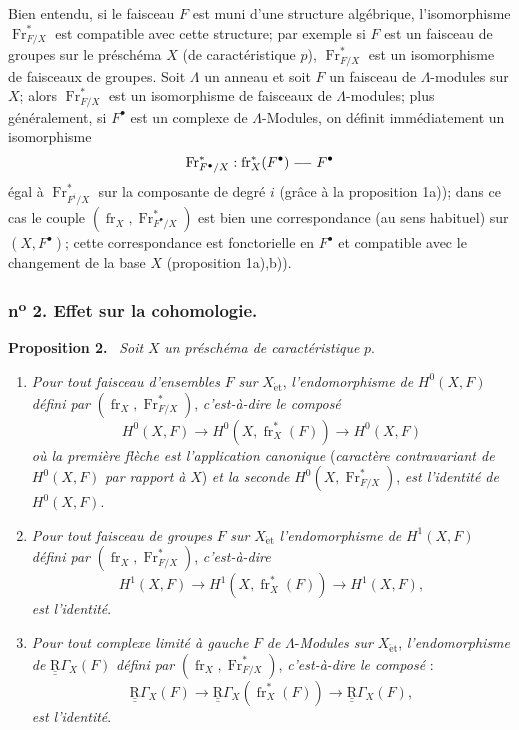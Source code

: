 \documentclass[11pt]{article}
\newenvironment{statement}[1]{\par\medskip\noindent\textbf{#1.}\ }{\par\medskip}
\providecommand{\et}{\mathrm{\acute{e}t}}
\providecommand{\fr}{\operatorname{fr}}
\providecommand{\Fr}{\operatorname{Fr}}
\providecommand{\Fr}{\operatorname{Fr}}
\providecommand{\fr}{\operatorname{fr}}
\providecommand{\et}{\acute{e}t}
\begin{document}
Bien entendu, si le faisceau $F$ est muni d'une structure algébrique, l'isomorphisme $\Fr^*_{F/X}$ est compatible avec cette structure; par exemple si $F$ est un faisceau de groupes sur le préschéma $X$ (de caractéristique $p$), $\Fr^*_{F/X}$ est un isomorphisme de faisceaux de groupes. Soit $\Lambda$ un anneau et soit $F$ un faisceau de $\Lambda$-modules sur $X$; alors $\operatorname{Fr}^*_{F/X}$ est un isomorphisme de faisceaux de $\Lambda$-modules; plus généralement, si $F^\bullet$ est un complexe de $\Lambda$-Modules, on définit immédiatement un isomorphisme
\[
\Fr^*_{F^\bullet/X}:\fr_X^*(F^\bullet)\relbar\joinrel\relbar F^\bullet
\]
égal à $\Fr^*_{F^i/X}$ sur la composante de degré $i$ (grâce à la proposition 1a)); dans ce cas le couple $(\fr_X,\Fr^*_{F^\bullet/X})$ est bien une correspondance (au sens habituel) sur $(X,F^\bullet)$; cette correspondance est fonctorielle en $F^\bullet$ et compatible avec le changement de la base $X$ (proposition 1a),b)).

\subsubsection*{n\textsuperscript{o} 2. Effet sur la cohomologie.}

\begin{statement}{Proposition 2}
\emph{Soit} $X$ \emph{un préschéma de caractéristique} $p$.
\begin{enumerate}[label=\alph*)]
\item \emph{Pour tout faisceau d'ensembles} $F$ \emph{sur} $X_{\et}$, \emph{l'endomorphisme de} $H^0(X,F)$ \emph{défini par} $(\fr_X,\Fr^*_{F/X})$, \emph{c'est-à-dire le composé}
\[
H^0(X,F)\longrightarrow H^0(X,\fr_X^*(F))\longrightarrow H^0(X,F)
\]
\emph{où la première flèche est l'application canonique} (\emph{caractère contravariant de} $H^0(X,F)$ \emph{par rapport à} $X$) \emph{et la seconde} $H^0(X,\Fr^*_{F/X})$, \emph{est l'identité de} $H^0(X,F)$.
\item
\emph{Pour tout faisceau de groupes} $F$ \emph{sur} $X_{\et}$ \emph{l'endomorphisme de} $H^1(X,F)$ \emph{défini par} $(\fr_X,\Fr^*_{F/X})$, \emph{c'est-à-dire}
\[
H^1(X,F)\longrightarrow H^1(X,\fr_X^*(F))\longrightarrow H^1(X,F),
\]
\emph{est l'identité}.
\item \emph{Pour tout complexe limité à gauche} $F$ \emph{de} $\Lambda$-\emph{Modules sur} $X_{\et}$, \emph{l'endomorphisme de} $\underline{\underline{\mathrm{R}}}\Gamma_X(F)$ \emph{défini par} $(\fr_X,\Fr^*_{F/X})$, \emph{c'est-à-dire le composé} :
\[
\underline{\underline{\mathrm{R}}}\Gamma_X(F)\longrightarrow \underline{\underline{\mathrm{R}}}\Gamma_X(\fr_X^*(F))\longrightarrow \underline{\underline{\mathrm{R}}}\Gamma_X(F),
\]
\emph{est l'identité}.
\end{enumerate}
\end{statement}
\end{document}
